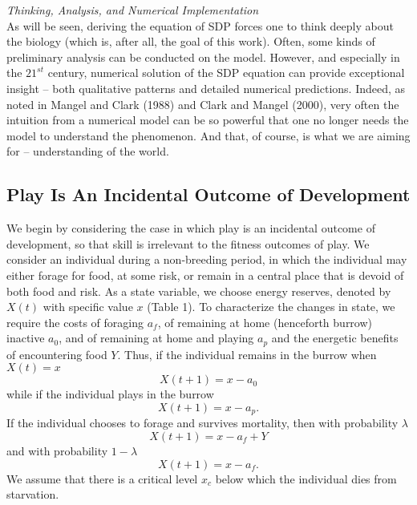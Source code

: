 \documentclass[12pt, letterpaper, fleqn]{article}
\begin{document}
	
	\noindent\textit{Thinking, Analysis, and Numerical Implementation}\\
	As will be seen, deriving the equation of SDP forces one to think deeply about the biology (which is, after all, the goal of this work). 
	Often, some kinds of preliminary analysis can be conducted on the model.  
	However, and especially in the $21^{st}$ century, numerical solution of the SDP equation can provide exceptional insight -- both qualitative patterns and detailed numerical predictions. 
	Indeed, as noted in Mangel and Clark (1988) and Clark and Mangel (2000), very often the intuition from a numerical model can be so powerful that one no longer needs the model to understand the phenomenon. 
	And that, of course, is what we are aiming for -- understanding of the world. 

	\subsection*{Play Is An Incidental Outcome of Development}
 
	We begin by considering the case in which play is an incidental outcome of development, so that skill is irrelevant to the fitness outcomes of play.
	We consider an individual during a non-breeding period, in which the individual may either forage for food, at some risk, or remain in a central place that is devoid of both food and risk.  
	As a state variable, we choose energy reserves, denoted by $X(t)$ with specific value $x$ (Table 1).  
	To characterize the changes in state, we require the costs of foraging $a_f$, of remaining at home (henceforth burrow) inactive $a_0$, and of remaining at home and playing $a_p$ and the energetic benefits of encountering food $Y$. 
	Thus, if the individual remains in the burrow when $X(t)=x$
	\begin{equation}
	X(t+1)=x-a_0
	\end{equation}
	while if the individual plays in the burrow
	\begin{equation}
	X(t+1)=x-a_p.
	\end{equation}
	If the individual chooses to forage and survives mortality, then with probability $\lambda$
	\begin{equation}
	X(t+1)=x-a_f+Y
	\end{equation}
	and with probability $1-\lambda$
	\begin{equation}
	X(t+1)=x-a_f.
	\end{equation}
	We assume that there is a critical level $x_c$ below which the individual dies from starvation.
	
\end{document}
